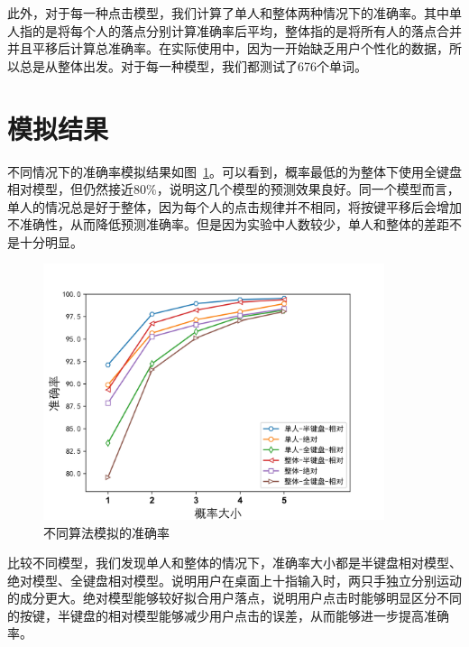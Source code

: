 此外，对于每一种点击模型，我们计算了单人和整体两种情况下的准确率。其中单人指的是将每个人的落点分别计算准确率后平均，整体指的是将所有人的落点合并并且平移后计算总准确率。在实际使用中，因为一开始缺乏用户个性化的数据，所以总是从整体出发。对于每一种模型，我们都测试了676个单词。

\section{模拟结果}
不同情况下的准确率模拟结果如图~\ref{fig:simulation}。可以看到，概率最低的为整体下使用全键盘相对模型，但仍然接近80\%，说明这几个模型的预测效果良好。同一个模型而言，单人的情况总是好于整体，因为每个人的点击规律并不相同，将按键平移后会增加不准确性，从而降低预测准确率。但是因为实验中人数较少，单人和整体的差距不是十分明显。

\begin{figure}[h] %
    \centering
    \includegraphics[width=10cm]{figures/acc.jpg}
    \caption{不同算法模拟的准确率}
    \label{fig:simulation}
\end{figure}

比较不同模型，我们发现单人和整体的情况下，准确率大小都是半键盘相对模型、绝对模型、全键盘相对模型。说明用户在桌面上十指输入时，两只手独立分别运动的成分更大。绝对模型能够较好拟合用户落点，说明用户点击时能够明显区分不同的按键，半键盘的相对模型能够减少用户点击的误差，从而能够进一步提高准确率。